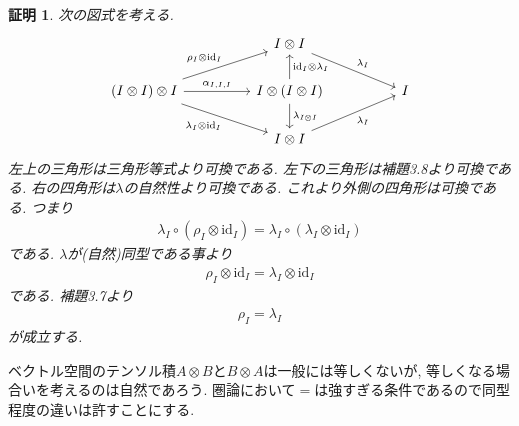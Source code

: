 \documentclass[a4paper,12pt]{ltjsarticle}
\theoremstyle{break}
\newtheorem*{prf}{証明}
\newcommand{\id}{\mathrm{id}}
\newcommand{\ci}{\circ}
\newcommand{\al}{\alpha}
\newcommand{\la}{\lambda}
\newcommand{\ot}{\otimes}
\numberwithin{equation}{section}
\begin{document}
\begin{prf}
  次の図式を考える. 
  \[\begin{tikzcd}
    && {I \ot I} \\
    {(I \ot I) \ot I} && {I \ot (I \ot I)} && I \\
    && {I \ot I}
    \arrow["{\rho_I \ot \id_I}", from=2-1, to=1-3]
    \arrow["{\al_{I,I,I}}", from=2-1, to=2-3]
    \arrow["{\id_I \ot \la_I}"', from=2-3, to=1-3]
    \arrow["{\la_I}", from=1-3, to=2-5]
    \arrow["{\la_I \ot \id_I}"', from=2-1, to=3-3]
    \arrow["{\la_I}"', from=3-3, to=2-5]
    \arrow["{\la_{I \ot I}}", from=2-3, to=3-3]
  \end{tikzcd}\]
  左上の三角形は三角形等式より可換である. 
  左下の三角形は補題3.8より可換である. 
  右の四角形は$\la$の自然性より可換である. 
  これより外側の四角形は可換である. 
  つまり
  \begin{align*}
    \la_I \ci (\rho_I \ot \id_I)=\la_I \ci (\la_I \ot \id_I)
  \end{align*}
  である. 
  $\la$が(自然)同型である事より
  \begin{align*}
    \rho_I \ot \id_I=\la_I \ot \id_I
  \end{align*}
  である. 
  補題3.7より
  \begin{align*}
    \rho_I=\la_I
  \end{align*}
  が成立する. 
\end{prf}

ベクトル空間のテンソル積$A \ot B$と$B \ot A$は一般には等しくないが, 等しくなる場合いを考えるのは自然であろう. 
圏論において$=$は強すぎる条件であるので同型程度の違いは許すことにする. 
\end{document}
